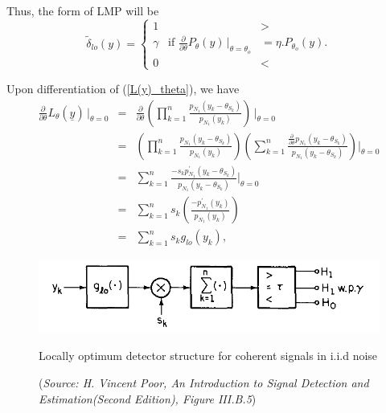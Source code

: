 \documentclass[a4paper,english,12pt]{article}
\begin{document}
\begin{exmp}
\begin{note}
Thus, the form of LMP will be
\begin{equation}
\tilde\delta_{lo}(y)=\begin{cases}
1&>\\
\gamma\hspace{10pt}\text{if }\frac{\partial}{\partial\theta}P_{\theta}(y)\hspace{2pt}\big|_{\theta=\theta_{o}}&=\eta.P_{\theta_{o}}(y).\\
0&<
\end{cases}
\end{equation} 
\end{note}

Upon differentiation of (\ref{L(y)_theta}), we have
\begin{eqnarray}
\frac{{\partial}}{\partial\theta}L_{\theta}(\underline{y})\hspace{2pt}|_{\theta=0}&=&\frac{\partial}{\partial\theta}\left(\prod_{k=1}^n\frac{p_{N_{1}}(y_{k}-\theta_{S_{k}})}{p_{N_{1}}(y_{k})}\right)\hspace{2pt}\Bigg|_{\theta=0}\nonumber\\
&=&\left(\prod_{k=1}^n\frac{p_{N_{1}}(y_{k}-\theta_{S_{k}})}{p_{N_{1}}(y_{k})}\right)\left(\sum_{k=1}^{n}\frac{\frac{\partial}{\partial\theta}p_{N_{1}}(y_{k}-\theta_{S_{k}})}{p_{N_{1}}(y_{k}-\theta_{S_{k}})}\right)\Bigg|_{\theta=0}\nonumber\\
&=&\sum_{k=1}^{n}\frac{-s_{k}p_{N_{1}}^\prime(y_{k}-\theta_{S_{k}})}{p_{N_{1}}(y_{k}-\theta_{S_{k}})}\Bigg|_{\theta=0}\nonumber\\
&=&\sum_{k=1}^{n}s_{k}\left(\frac{-p_{N_{1}}^\prime(y_{k})}{p_{N_{1}}(y_{k})}\right)\nonumber\\
&=&\sum_{k=1}^{n}s_{k}g_{lo}(y_{k}),
\end{eqnarray}
\begin{figure}[h]
\centering
\captionsetup{justification=centering}
\includegraphics[width=0.8\linewidth]{Figures/lec10Fig4}
\caption{Locally optimum detector structure for coherent signals in i.i.d noise}
\caption*{\footnotesize(\textit{Source: H. Vincent Poor, An Introduction to Signal Detection and Estimation(Second Edition), Figure	 III.B.5})}
\label{fig:Fig4}
\end{figure}\
\begin{figure}[h]

\end{figure}
\end{exmp}
\end{document}
